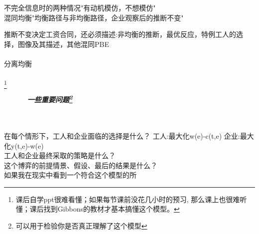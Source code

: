 \documentclass{article}
\begin{document}
不完全信息时的两种情况"有动机模仿，不想模仿"\\

混同均衡"均衡路径与非均衡路径，企业观察后的推断不变"

推断不变决定工资合同，还必须描述:非均衡的推断，最优反应，特例工人的选择，图像及其描述，其他混同PBE\\
\\分离均衡\\\\


\footnote{课后自学ppt很难看懂；如果每节课前没花几小时的预习,
那么课上也很难听懂；课后找到Gibbons的教材才基本搞懂这个模型。}

\begin{center}
    \textbf{\emph{一些重要问题\footnote{可以用于检验你是否真正理解了这个模型}}}\\\\
    \end{center}

在每个情形下，工人和企业面临的选择是什么？ 工人:最大化w(e)-c(t,e) 企业:最大化y(t,e)-w(e)\\
工人和企业最终采取的策略是什么？\\
这个博弈的前提情景、假设、最后的结果是什么？\\
如果我在现实中看到一个符合这个模型的所
\end{document}
